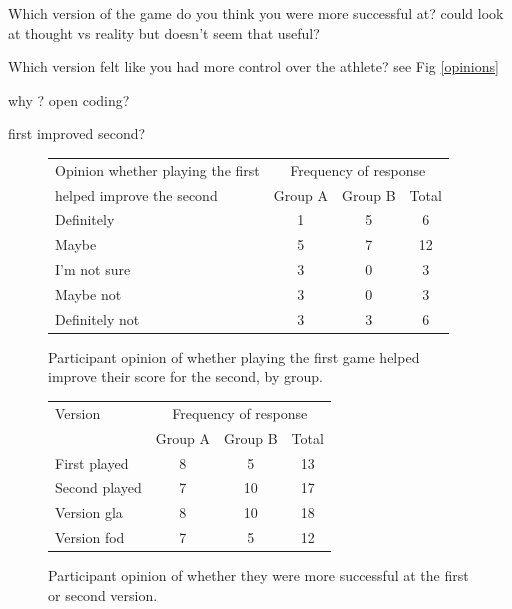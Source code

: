 \documentclass[12pt,a4paper,twoside,openright]{report}
\begin{document}
Which version of the game do you think you were more successful at?
could look at thought vs reality but doesn't seem that useful?

Which version felt like you had more control over the athlete?
see Fig \ref{opinions} 

why ? open coding?

first improved second?

\begin{figure}[tbh]
\begin{center}
\begin{tabular}{ |p{6cm}|c|c|c| }
  \hline
Opinion whether playing the first& \multicolumn{3}{|c|}{Frequency of response} \\ \cline{2-4}
helped improve the second& Group A& Group B&Total\\ \hline
Definitely     & 1 & 5 & 6 \\ \hline
Maybe          & 5 & 7 & 12\\ \hline
I'm not sure   & 3 & 0 & 3 \\ \hline
Maybe not      & 3 & 0 & 3 \\ \hline
Definitely not & 3 & 3 & 6 \\ \hline
\end{tabular}
\end{center}
\caption{Participant opinion of whether playing the first game helped improve their score for the second, by group.}
\label{firstHelpedSecond}
\end{figure}


\begin{figure}[tbh]
\begin{center}
\begin{tabular}{ |p{6cm}|c|c|c| }
  \hline
Version& \multicolumn{3}{|c|}{Frequency of response} \\ \cline{2-4}
& Group A& Group B&Total\\ \hline\hline
First played   & 8 & 5  & 13 \\ \hline
Second played  & 7 & 10 & 17 \\ \hline\hline
Version gla    & 8 & 10 & 18 \\ \hline
Version fod    & 7 & 5  & 12 \\ \hline
\end{tabular}
\end{center}
\caption{Participant opinion of whether they were more successful at the first or second version.}
\label{successfull}
\end{figure}
\end{document}
